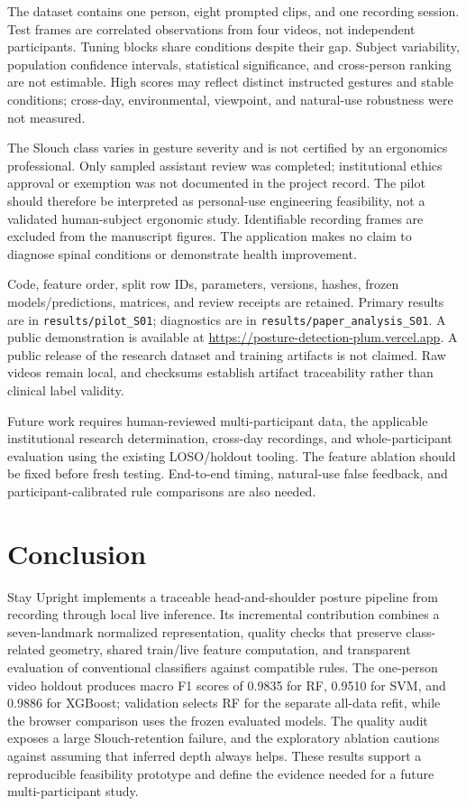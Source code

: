 \documentclass[conference]{IEEEtran}
\begin{document}
The dataset contains one person, eight prompted clips, and one recording session. Test frames are correlated observations from four videos, not independent participants. Tuning blocks share conditions despite their gap. Subject variability, population confidence intervals, statistical significance, and cross-person ranking are not estimable. High scores may reflect distinct instructed gestures and stable conditions; cross-day, environmental, viewpoint, and natural-use robustness were not measured.

The Slouch class varies in gesture severity and is not certified by an ergonomics professional. Only sampled assistant review was completed; institutional ethics approval or exemption was not documented in the project record. The pilot should therefore be interpreted as personal-use engineering feasibility, not a validated human-subject ergonomic study. Identifiable recording frames are excluded from the manuscript figures. The application makes no claim to diagnose spinal conditions or demonstrate health improvement.

Code, feature order, split row IDs, parameters, versions, hashes, frozen models/predictions, matrices, and review receipts are retained. Primary results are in \texttt{results/pilot\_S01}; diagnostics are in \texttt{results/paper\_analysis\_S01}. A public demonstration is available at \url{https://posture-detection-plum.vercel.app}. A public release of the research dataset and training artifacts is not claimed. Raw videos remain local, and checksums establish artifact traceability rather than clinical label validity.

Future work requires human-reviewed multi-participant data, the applicable institutional research determination, cross-day recordings, and whole-participant evaluation using the existing LOSO/holdout tooling. The feature ablation should be fixed before fresh testing. End-to-end timing, natural-use false feedback, and participant-calibrated rule comparisons are also needed.

\section{Conclusion}
Stay Upright implements a traceable head-and-shoulder posture pipeline from recording through local live inference. Its incremental contribution combines a seven-landmark normalized representation, quality checks that preserve class-related geometry, shared train/live feature computation, and transparent evaluation of conventional classifiers against compatible rules. The one-person video holdout produces macro F1 scores of 0.9835 for RF, 0.9510 for SVM, and 0.9886 for XGBoost; validation selects RF for the separate all-data refit, while the browser comparison uses the frozen evaluated models. The quality audit exposes a large Slouch-retention failure, and the exploratory ablation cautions against assuming that inferred depth always helps. These results support a reproducible feasibility prototype and define the evidence needed for a future multi-participant study.
\end{document}
